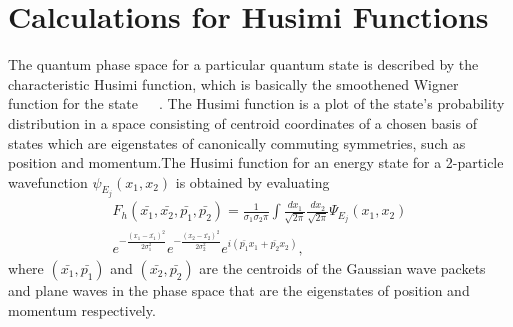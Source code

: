 \chapter{Calculations for Husimi Functions}
%
The quantum phase space for a particular quantum state is described by the characteristic Husimi function, which is basically the smoothened Wigner function for the state~\cite{wigner}~\cite{husimi}~\cite{Hillery:qdf}. The Husimi function is a plot of the state's probability distribution in a space consisting of centroid coordinates of a chosen basis of states which are eigenstates of canonically commuting symmetries, such as position and momentum.The Husimi function for an energy state for a 2-particle  wavefunction $\psi_{E_j}(x_1,x_2)$ is obtained by evaluating
%
\begin{multline}
F_h(\bar{x_1},\bar{x_2},\bar{p_1},\bar{p_2})=\frac{1}{\sigma_1 \sigma_2 \pi} \int \frac{dx_1}{\sqrt{2\pi}} \frac{dx_2}{\sqrt{2\pi}} \Psi_{E_j}(x_1,x_2) \\
e^{-\frac{(x_1-\bar{x_1})^2}{2\sigma^2_1}} e^{-\frac{(x_2-\bar{x_2})^2}{2\sigma^2_2}} e^{i (\bar{p_1}x_1 + \bar{p_2}x_2)},
\label{eq:husimi:appendix}
\end{multline}
%
where $(\bar{x_1},\bar{p_1})$ and $(\bar{x_2},\bar{p_2})$ are the centroids of the Gaussian wave packets and plane waves in the phase space that are the eigenstates of position and momentum respectively.

